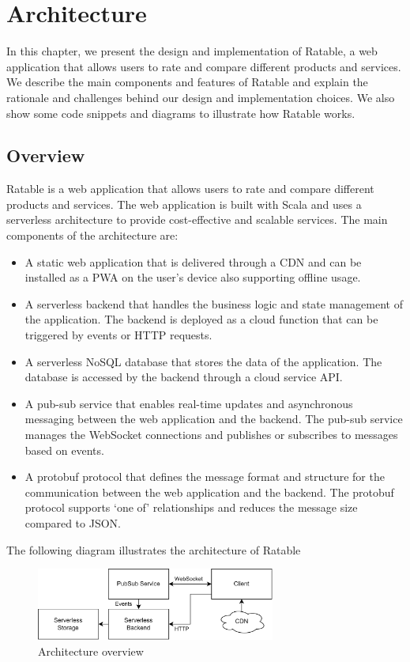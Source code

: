 \documentclass[
	english,
	ruledheaders=section,   %
	class=report,		    %
	thesis={type=bachelor}, %
	accentcolor=9c,			%
	custommargins=true,    %
	marginpar=false,        %
	parskip=half-,          %
	fontsize=11pt,          %
]{tudapub}
\begin{document}
\chapter{Architecture}

In this chapter, we present the design and implementation of Ratable, a web application that allows users to rate and compare different products and services. We describe the main components and features of Ratable and explain the rationale and challenges behind our design and implementation choices. We also show some code snippets and diagrams to illustrate how Ratable works.

\section{Overview}

Ratable is a web application that allows users to rate and compare different products and services. The web application is built with Scala and uses a serverless architecture to provide cost-effective and scalable services. The main components of the architecture are:

\begin{itemize}
  \item A static web application that is delivered through a CDN and can be installed as a PWA on the user’s device also supporting offline usage.
  \item A serverless backend that handles the business logic and state management of the application. The backend is deployed as a cloud function that can be triggered by events or HTTP requests.
  \item A serverless NoSQL database that stores the data of the application. The database is accessed by the backend through a cloud service API.
  \item A pub-sub service that enables real-time updates and asynchronous messaging between the web application and the backend. The pub-sub service manages the WebSocket connections and publishes or subscribes to messages based on events.
  \item A protobuf protocol that defines the message format and structure for the communication between the web application and the backend. The protobuf protocol supports ‘one of’ relationships and reduces the message size compared to JSON. ~\cite{protobuf}
\end{itemize}
The following diagram illustrates the architecture of Ratable

\begin{figure}[h]
  \centering
  \includegraphics[width=0.7\textwidth]{architecture_services.png}
  \caption{Architecture overview}
\end{figure}
\end{document}
